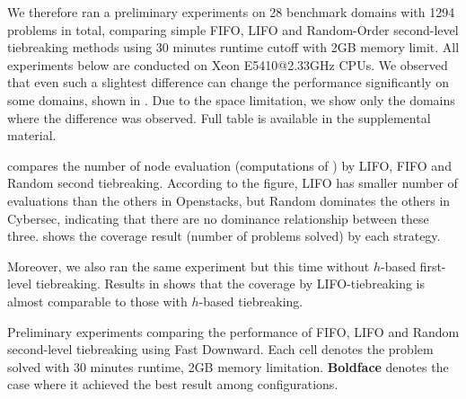 We therefore ran a preliminary experiments on 28 benchmark domains with
1294 problems in total, comparing simple FIFO, LIFO and Random-Order
second-level tiebreaking methods using 30 minutes runtime cutoff with
2GB memory limit.  All experiments below are conducted on Xeon
E5410@2.33GHz CPUs. We observed that even such a slightest difference
can change the performance significantly on some domains, shown in
. Due to the space limitation, we show only the
domains where the difference was observed. Full table is available in
the supplemental material.

 compares the number of
node evaluation (computations of \lmcut) by LIFO, FIFO and Random second
tiebreaking.  According to the figure, LIFO has smaller number of
evaluations than the others in Openstacks, but Random dominates the
others in Cybersec, indicating that there are no dominance relationship
between these three.   shows the coverage result
(number of problems solved) by each strategy.

Moreover, we also ran the same experiment but this time without $h$-based
first-level tiebreaking. Results in  shows that the
coverage by LIFO-tiebreaking is almost comparable to those with $h$-based
tiebreaking.


% 
\begin{table}[htbp]
 \centering {}
 
 \caption{Preliminary experiments comparing the performance of FIFO,
 LIFO and Random second-level tiebreaking using Fast Downward. Each cell
 denotes the problem solved with 30 minutes runtime, 2GB memory
 limitation. \textbf{Boldface} denotes the case where it achieved the
 best result among configurations.} \label{single-coverage}
\end{table}

